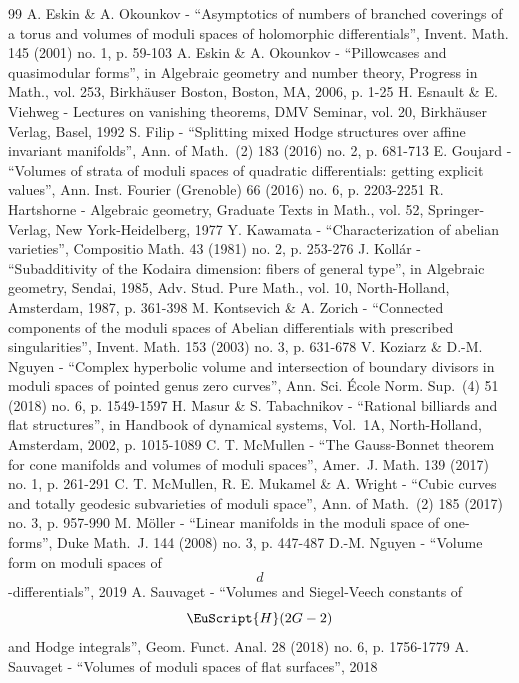 \documentclass[10pt]{amsart}
\let\mathcal\EuScript
\theoremstyle{plain}
\theoremstyle{definition}
\begin{document}
\begin{thebibliography}{99}
 A. Eskin \& A. Okounkov - “Asymptotics of numbers of branched coverings of a torus and volumes of moduli spaces of holomorphic differentials”, Invent. Math. 145 (2001) no. 1, p. 59-103
 A. Eskin \& A. Okounkov - “Pillowcases and quasimodular forms”, in Algebraic geometry and number theory, Progress in Math., vol. 253, Birkhäuser Boston, Boston, MA, 2006, p. 1-25
 H. Esnault \& E. Viehweg - Lectures on vanishing theorems, DMV Seminar, vol. 20, Birkhäuser Verlag, Basel, 1992
 S. Filip - “Splitting mixed Hodge structures over affine invariant manifolds”, Ann. of Math. (2) 183 (2016) no. 2, p. 681-713
 E. Goujard - “Volumes of strata of moduli spaces of quadratic differentials: getting explicit values”, Ann. Inst. Fourier (Grenoble) 66 (2016) no. 6, p. 2203-2251
 R. Hartshorne - Algebraic geometry, Graduate Texts in Math., vol. 52, Springer-Verlag, New York-Heidelberg, 1977
 Y. Kawamata - “Characterization of abelian varieties”, Compositio Math. 43 (1981) no. 2, p. 253-276
 J. Kollár - “Subadditivity of the Kodaira dimension: fibers of general type”, in Algebraic geometry, Sendai, 1985, Adv. Stud. Pure Math., vol. 10, North-Holland, Amsterdam, 1987, p. 361-398
 M. Kontsevich \& A. Zorich - “Connected components of the moduli spaces of Abelian differentials with prescribed singularities”, Invent. Math. 153 (2003) no. 3, p. 631-678
 V. Koziarz \& D.-M. Nguyen - “Complex hyperbolic volume and intersection of boundary divisors in moduli spaces of pointed genus zero curves”, Ann. Sci. École Norm. Sup. (4) 51 (2018) no. 6, p. 1549-1597
 H. Masur \& S. Tabachnikov - “Rational billiards and flat structures”, in Handbook of dynamical systems, Vol. 1A, North-Holland, Amsterdam, 2002, p. 1015-1089
 C. T. McMullen - “The Gauss-Bonnet theorem for cone manifolds and volumes of moduli spaces”, Amer. J. Math. 139 (2017) no. 1, p. 261-291
 C. T. McMullen, R. E. Mukamel \& A. Wright - “Cubic curves and totally geodesic subvarieties of moduli space”, Ann. of Math. (2) 185 (2017) no. 3, p. 957-990
 M. Möller - “Linear manifolds in the moduli space of one-forms”, Duke Math. J. 144 (2008) no. 3, p. 447-487
 D.-M. Nguyen - “Volume form on moduli spaces of $$d$$-differentials”, 2019
 A. Sauvaget - “Volumes and Siegel-Veech constants of $$\mathcal{H}(2G-2)$$ and Hodge integrals”, Geom. Funct. Anal. 28 (2018) no. 6, p. 1756-1779
 A. Sauvaget - “Volumes of moduli spaces of flat surfaces”, 2018

\end{thebibliography}
\end{document}
